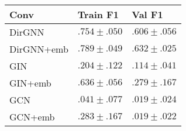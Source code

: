 \begin{tabular}{lll}
\toprule
Conv & Train \textbf{F1} & Val \textbf{F1} \\
\midrule
DirGNN & $.754\scriptstyle \pm .050$ & $.606\scriptstyle \pm .056$ \\
DirGNN+emb & $\mathbf{.789\scriptstyle \pm .049}$ & $\mathbf{.632\scriptstyle \pm .025}$ \\
GIN & $.204\scriptstyle \pm .122$ & $.114\scriptstyle \pm .041$ \\
GIN+emb & $.636\scriptstyle \pm .056$ & $.279\scriptstyle \pm .167$ \\
GCN & $.041\scriptstyle \pm .077$ & $.019\scriptstyle \pm .024$ \\
GCN+emb & $.283\scriptstyle \pm .167$ & $.019\scriptstyle \pm .022$ \\
\bottomrule
\end{tabular}

